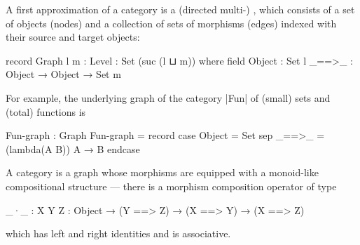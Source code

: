 A first approximation of a category is a (directed multi-) , which consists of a set of objects (nodes) and a collection of sets of morphisms (edges) indexed with their source and target objects:
\begin{code}
record Graph {l m : Level} : Set (suc (l ⊔ m)) where
  field
    Object    :  Set l
    _==>_     :  Object → Object → Set m
\end{code}
For example, the underlying graph of the category |Fun| of (small) sets and (total) functions is
\begin{code}
Fun-graph : Graph
Fun-graph = record  case  Object  = Set
                    sep   _==>_   = (lambda(A B)) A → B endcase
\end{code}
A category is a graph whose morphisms are equipped with a monoid-like compositional structure --- there is a morphism composition operator of type
\begin{code}
_·_  : {X Y Z : Object} → (Y ==> Z) → (X ==> Y) → (X ==> Z)
\end{code}
which has left and right identities and is associative.


